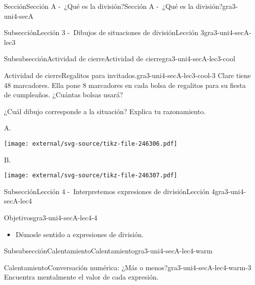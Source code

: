 \documentclass[twoside,10pt,]{article}
\begin{document}
\begin{sectionptx}{Sección}{Sección A -~¿Qué es la división?}{}{Sección A -~¿Qué es la división?}{}{}{gra3-uni4-secA}
\begin{subsectionptx}{Subsección}{Lección 3 -~Dibujos de situaciones de división}{}{Lección 3}{}{}{gra3-uni4-secA-lec3}
%
\begin{subsubsectionptx}{Subsubsección}{Actividad de cierre}{}{Actividad de cierre}{}{}{gra3-uni4-secA-lec3-cool}
\begin{project}{Actividad de cierre}{Regalitos para invitados.}{gra3-uni4-secA-lec3-cool-3}%
Clare tiene 48 marcadores. Ella pone 8 marcadores en cada bolsa de regalitos para su fiesta de cumpleaños. ¿Cuántas bolsas usará?%
\par
¿Cuál dibujo corresponde a la situación? Explica tu razonamiento.%
\begin{sidebyside}{2}{0}{0}{0}%
\begin{sbspanel}{0.5}%
A.%
\par
\texttt{[image: external/svg-source/tikz-file-246306.pdf]}
\end{sbspanel}%
\begin{sbspanel}{0.5}%
B.%
\par
\texttt{[image: external/svg-source/tikz-file-246307.pdf]}
\end{sbspanel}%
\end{sidebyside}%
\end{project}%
\end{subsubsectionptx}
\end{subsectionptx}
%
%
\typeout{************************************************}
\typeout{************************************************}
%
\begin{subsectionptx}{Subsección}{Lección 4 -~Interpretemos expresiones de división}{}{Lección 4}{}{}{gra3-uni4-secA-lec4}
\begin{objectives}{Objetivos}{gra3-uni4-secA-lec4-4}
%
\begin{itemize}[label=\textbullet]
\item{}Démosle sentido a expresiones de división.%
\end{itemize}
\end{objectives}
%
%
\typeout{************************************************}
\typeout{************************************************}
%
\begin{subsubsectionptx}{Subsubsección}{Calentamiento}{}{Calentamiento}{}{}{gra3-uni4-secA-lec4-warm}
\begin{exploration}{Calentamiento}{Conversación numérica: ¿Más o menos?}{gra3-uni4-secA-lec4-warm-3}%
Encuentra mentalmente el valor de cada expresión.%
\par

\end{exploration}
\end{subsubsectionptx}
\end{subsectionptx}
\end{sectionptx}
\end{document}
